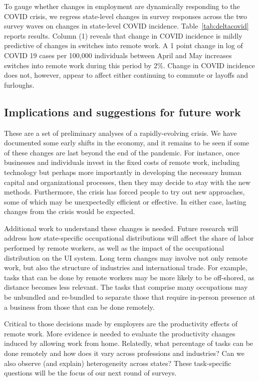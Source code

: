 \documentclass[12pt]{article}
\begin{document}
To gauge whether changes in employment are dynamically responding to the COVID crisis, we regress state-level changes in survey responses across the two survey waves on changes in state-level COVID incidence. Table~\ref{tab:deltacovid} reports results. Column (1) reveals that change in COVID incidence is mildly predictive of changes in switches into remote work. A 1 point change in log of COVID 19 cases per 100,000 individuals between April and May increases switches into remote work during this period by 2\%. Change in COVID incidence does not, however, appear to affect either continuing to commute or layoffs and furloughs.



\subsection{Implications and suggestions for future work}
These are a set of preliminary analyses of a rapidly-evolving crisis. We have documented some early shifts in the economy, and it remains to be seen if some of these changes are last beyond the end of the pandemic. For instance, once businesses and individuals invest in the fixed costs of remote work, including technology but perhaps more importantly in developing the necessary human capital and organizational processes, then they may decide to stay with the new methods.  Furthermore, the crisis has forced people to try out new approaches, some of which may be unexpectedly efficient or effective.  In either case, lasting changes from the crisis would be expected.  

Additional work to understand these changes is needed. Future research will address how state-specific occupational distributions will affect the share of labor performed by remote workers, as well as the impact of the occupational distribution on the UI system.  Long term changes may involve not only remote work, but also  the structure of industries and international trade. For example, tasks that can be done by remote workers may be more likely to be off-shored, as distance becomes less relevant. The tasks that comprise many occupations may be unbundled and re-bundled to separate those that require in-person presence at a business from those that can be done remotely.

Critical to those decisions made by employers are the productivity effects of remote work. More evidence is needed to evaluate the productivity changes induced by allowing work from home. Relatedly, what percentage of tasks can be done remotely and how does it vary across professions and industries? Can we also observe (and explain) heterogeneity across states? These task-specific questions will be the focus of our next round of surveys.
\end{document}
